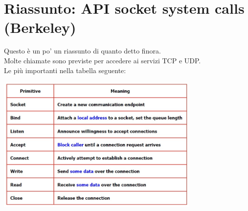 \section{Riassunto: API socket system calls (Berkeley)}
Questo è un po' un riassunto di quanto detto finora.
\\Molte chiamate sono previste per accedere ai servizi TCP e UDP.
\\Le più importanti nella tabella seguente:
\begin{center}
    \includegraphics[width=0.75\textwidth]{img/berkeley1.jpg}
\end{center}

